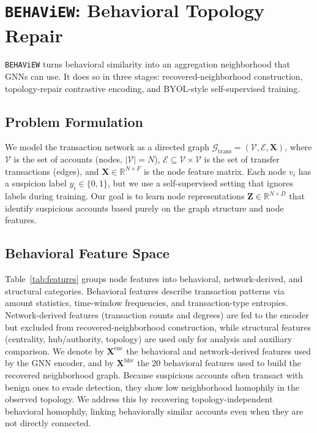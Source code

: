 \documentclass[sigconf,natbib=true,anonymous=true]{acmart}
\theoremstyle{definition}
\newcommand{\method}{\texttt{BEHAViEW}\xspace}
\begin{document}
\section{\method: Behavioral Topology Repair}
\label{sec:method}

\method turns behavioral similarity into an aggregation neighborhood that GNNs can use. It does so in three stages: recovered-neighborhood construction, topology-repair contrastive encoding, and BYOL-style self-supervised training.


\subsection{Problem Formulation}
We model the transaction network as a directed graph $\mathcal{G}_{\text{trans}} = (\mathcal{V}, \mathcal{E}, \mathbf{X})$, where $\mathcal{V}$ is the set of accounts (nodes, $|\mathcal{V}|=N$), $\mathcal{E} \subseteq \mathcal{V} \times \mathcal{V}$ is the set of transfer transactions (edges), and $\mathbf{X} \in \mathbb{R}^{N \times F}$ is the node feature matrix. Each node $v_i$ has a suspicion label $y_i \in \{0, 1\}$, but we use a self-supervised setting that ignores labels during training. Our goal is to learn node representations $\mathbf{Z} \in \mathbb{R}^{N \times D}$ that identify suspicious accounts based purely on the graph structure and node features.

\subsection{Behavioral Feature Space}
\label{subsec:feature_taxonomy}
Table~\ref{tab:features} groups node features into behavioral, network-derived, and structural categories. Behavioral features describe transaction patterns via amount statistics, time-window frequencies, and transaction-type entropies. Network-derived features (transaction counts and degrees) are fed to the encoder but excluded from recovered-neighborhood construction, while structural features (centrality, hub/authority, topology) are used only for analysis and auxiliary comparison. We denote by $\mathbf{X}^{\text{enc}}$ the behavioral and network-derived features used by the GNN encoder, and by $\mathbf{X}^{\text{bhv}}$ the 20 behavioral features used to build the recovered neighborhood graph. Because suspicious accounts often transact with benign ones to evade detection, they show low neighborhood homophily in the observed topology. We address this by recovering topology-independent behavioral homophily, linking behaviorally similar accounts even when they are not directly connected.
\end{document}
